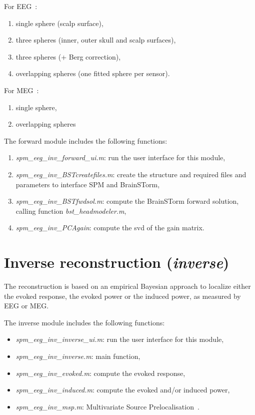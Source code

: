 For EEG~\cite{Ermer2001}:
\begin{enumerate}
	\item single sphere (scalp surface),
	\item three spheres (inner, outer skull and scalp surfaces),
	\item three spheres (+ Berg correction),
	\item overlapping spheres (one fitted sphere per sensor).
\end{enumerate}

For MEG~\cite{Huang1999}:
\begin{enumerate}
	\item single sphere,
	\item overlapping spheres
\end{enumerate}


The forward module includes the following functions:
\begin{enumerate}
	\item \textit{spm\_eeg\_inv\_forward\_ui.m}: run the user interface for this module,
	\item \textit{spm\_eeg\_inv\_BSTcreatefiles.m}:	create the structure and required files and parameters to interface SPM and BrainSTorm,
	\item \textit{spm\_eeg\_inv\_BSTfwdsol.m}:	compute the BrainSTorm forward solution, calling function \textit{bst\_headmodeler.m},
	\item \textit{spm\_eeg\_inv\_PCAgain}: compute the svd of the gain matrix.
\end{enumerate}


\section{Inverse reconstruction (\textit{inverse})}
The reconstruction is based on an empirical Bayesian approach to localize either the evoked response, the evoked power or the induced power, as measured by EEG or MEG.

The inverse module includes the following functions:
\begin{itemize}
	\item \textit{spm\_eeg\_inv\_inverse\_ui.m}: run the user interface for this module,
	\item \textit{spm\_eeg\_inv\_inverse.m}: main function,
	\item \textit{spm\_eeg\_inv\_evoked.m}:	compute the evoked response,
	\item \textit{spm\_eeg\_inv\_induced.m}:	compute the evoked and/or induced power,
	\item \textit{spm\_eeg\_inv\_msp.m}: Multivariate Source Prelocalisation~\cite{Mattout2005a}.
\end{itemize}
	

